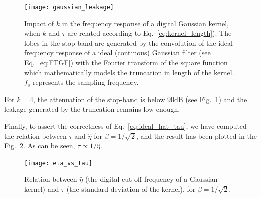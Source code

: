 \documentclass{article}
\begin{document}
\begin{figure}
  \centering
  \href{https://nbviewer.org/github/vicente-gonzalez-ruiz/denoising/blob/main/notebooks/gaussian_leakage.ipynb\#Gaussian_leakage}{\texttt{[image: gaussian\_leakage]}}
  \caption{Impact of $k$ in the frequency response of a digital
    Gaussian kernel, when $k$ and $\tau$ are related according
    to Eq.~\ref{eq:kernel_length}). The lobes in the stop-band are
    generated by the convolution of the ideal frequency response of a
    ideal (continous) Gaussian filter (see Eq.~\ref{eq:FTGF}) with the
    Fourier transform of the square function which mathematically
    models the truncation in length of the kernel. $f_s$ represents
    the sampling frequency.\label{fig:gaussian_leakage}}
\end{figure}

For $k=4$, the attenuation of the stop-band is below $90\text{dB}$
(see Fig.~\ref{fig:gaussian_leakage}) and the leakage generated by the
truncation remains low enough.

Finally, to assert the correctness of Eq.~\ref{eq:ideal_hat_tau}, we
have computed the relation between $\tau$ and $\hat{\eta}$ for
$\beta=1/\sqrt{2}$, and the result has been plotted in the
Fig.~\ref{fig:eta_vs_tau}. As can be seen, $\tau\propto 1/\hat{\eta}$.

\begin{figure}
  \centering
  \href{https://nbviewer.org/github/vicente-gonzalez-ruiz/denoising/blob/main/notebooks/eta_vs_tau.ipynb\#Eta_vs_tau}{\texttt{[image: eta\_vs\_tau]}}
  \caption{Relation between $\hat\eta$ (the digital cut-off frequency
    of a Gaussian kernel) and $\tau$ (the standard deviation of
    the kernel), for $\beta=1/\sqrt{2}$.\label{fig:eta_vs_tau}}
\end{figure}

\end{document}
